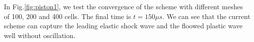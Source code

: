 \documentclass{article}
\numberwithin{equation}{section}
\numberwithin{table}{section}
\begin{document}
In Fig.\ref{fig:piston1}, we test the convergence of the scheme with different meshes of 100, 200 and 400 cells. The final time is $t = 150 \mu s $.  We can  see that the current scheme can capture the leading elastic shock wave and the floowed plastic wave well without oscillation. 
\begin{figure}
\end{figure}
\end{document}
